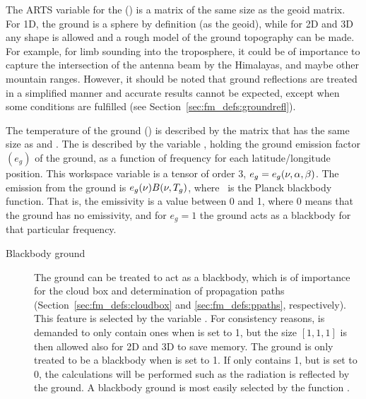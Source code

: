 The ARTS variable for the 
() is a matrix of the same size as the geoid
matrix. For 1D, the ground is a sphere by definition (as the geoid),
while for 2D and 3D any shape is allowed and a rough model of the
ground topography can be made. For example, for limb sounding into the
troposphere, it could be of importance to capture the intersection of
the antenna beam by the Himalayas, and maybe other mountain ranges.
However, it should be noted that ground reflections are treated in a
simplified manner and accurate results cannot be expected, except when
some conditions are fulfilled (see
Section~\ref{sec:fm_defs:groundrefl}).

The temperature of the ground () is
described by the matrix  that has the same size as
 and . The  is described by the variable , holding
the ground emission factor $(e_g)$ of the ground, as a function of
frequency for each latitude/longitude position. This workspace
variable is a tensor of order 3, $e_g = e_g(\nu,\alpha,\beta)$. The
emission from the ground is $e_g(\nu)B(\nu,T_{g})$, where
\Planck\ is the Planck blackbody function. That is, the emissivity is
a value between 0 and 1, where 0 means that the ground has no
emissivity, and for $e_g=1$ the ground acts as a blackbody for that
particular frequency.

\begin{description}
\item[Blackbody ground] The ground can be
  treated to act as a blackbody, which is of importance for the cloud
  box and determination of propagation paths
  (Section~\ref{sec:fm_defs:cloudbox} and \ref{sec:fm_defs:ppaths},
  respectively). This feature is selected by the variable
  . For consistency reasons,
   is demanded to only contain ones when
   is set to 1, but the size $[1,1,1]$ is
  then allowed also for 2D and 3D to save memory. The ground is only
  treated to be a blackbody when  is set
  to 1. If  only contains 1, but
   is set to 0, the calculations will be
  performed such as the radiation is reflected by the ground. A
  blackbody ground is most easily selected by the function
  .
\end{description}



